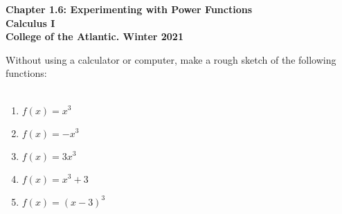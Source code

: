 \documentclass[12pt]{article}
\begin{document}
\pagestyle{empty}
\begin{center}
{\Large {\bf Chapter 1.6: Experimenting with Power Functions }}\\
\medskip
{\large {\bf Calculus I}}\\
\medskip
{\bf College of the Atlantic.  Winter 2021}\\
\end{center}
\medskip

Without using a calculator or computer, make a rough sketch of the
following functions:  \\
\hspace{2mm}\\

\begin{enumerate}
\setlength{\itemsep}{1cm}

\item $f(x) = x^3$

\item $f(x) = -x^3$

\item $f(x) = 3x^3$

\item $f(x) = x^3 + 3$

\item $f(x) = (x-3)^3$

\end{enumerate}
\end{document}
